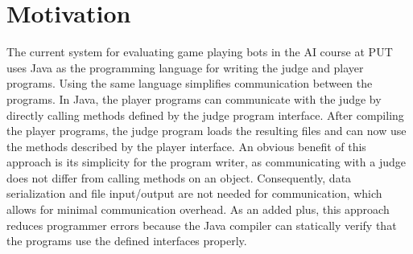 \section{Motivation} %


The current system for evaluating game playing bots in the AI course at PUT uses Java as the programming language for writing the judge and player programs. Using the same language simplifies communication between the programs. In Java, the player programs can communicate with the judge by directly calling methods defined by the judge program interface. After compiling the player programs, the judge program loads the resulting  files and can now use the methods described by the player interface. An obvious benefit of this approach is its simplicity for the program writer, as communicating with a judge does not differ from calling methods on an object. Consequently, data serialization and file input/output are not needed for communication, which allows for minimal communication overhead. As an added plus, this approach reduces programmer errors because the Java compiler can statically verify that the programs use the defined interfaces properly.

